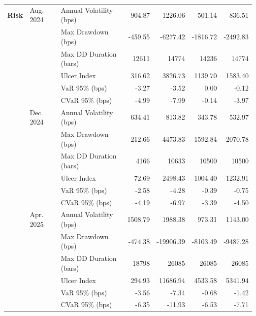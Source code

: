 \begin{table}[H]
{\begin{tabular*}{\textwidth}{@{\extracolsep{\fill}} l l l r r r r}
\textbf{Risk}
& Aug. 2024 & Annual Volatility (bps)   & 904.87    & 1226.06    & 501.14     & 836.51 \\
&           & Max Drawdown (bps)        & -459.55   & -6277.42   & -1816.72   & -2492.83 \\
&           & Max DD Duration (bars)    & 12611     & 14774      & 14236      & 14774 \\
&           & Ulcer Index               & 316.62    & 3826.73    & 1139.70    & 1583.40 \\
&           & VaR 95\% (bps)            & -3.27     & -3.52      & 0.00       & -0.12 \\
&           & CVaR 95\% (bps)           & -4.99     & -7.99      & -0.14      & -3.97 \\
& Dec. 2024 & Annual Volatility (bps)   & 634.41   & 813.82     & 343.78     & 532.97 \\
&           & Max Drawdown (bps)        & -212.66  & -4473.83   & -1592.84   & -2070.78 \\
&           & Max DD Duration (bars)    & 4166     & 10633      & 10500      & 10500 \\
&           & Ulcer Index               & 72.69    & 2498.43    & 1004.40    & 1232.91 \\
&           & VaR 95\% (bps)            & -2.58    & -4.28      & -0.39      & -0.75 \\
&           & CVaR 95\% (bps)           & -4.19    & -6.97      & -3.39      & -4.50 \\
& Apr. 2025 & Annual Volatility (bps)   & 1508.79  & 1988.38     & 973.31      & 1143.00 \\
&           & Max Drawdown (bps)        & -474.38  & -19906.39   & -8103.49    & -9487.28 \\
&           & Max DD Duration (bars)    & 18798    & 26085       & 26085       & 26085 \\
&           & Ulcer Index               & 294.93   & 11686.94    & 4533.58     & 5341.94 \\
&           & VaR 95\% (bps)            & -3.56    & -7.34       & -0.68       & -1.42 \\
&           & CVaR 95\% (bps)           & -6.35    & -11.93      & -6.53       & -7.71 \\
\midrule


\end{tabular*}}
\end{table}
